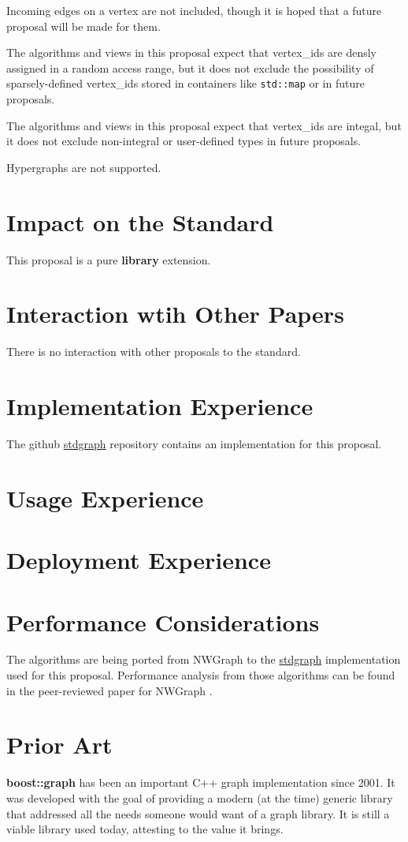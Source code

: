 Incoming edges on a vertex are not included, though it is hoped that a future proposal will be made for them.

The algorithms and views in this proposal expect that vertex\_ids are densly assigned in a random access range, but it does not exclude the possibility of sparsely-defined vertex\_ids stored in containers like \lstinline{std::map} or  in future proposals. 

The algorithms and views in this proposal expect that vertex\_ids are integal, but it does not exclude non-integral or user-defined types in future proposals.

Hypergraphs are not supported.

\section{Impact on the Standard}
This proposal is a pure \textbf{library} extension.

\section{Interaction wtih Other Papers}
There is no interaction with other proposals to the standard.

\section{Implementation Experience}
The github \href{https://github.com/stdgraph}{stdgraph} repository contains an implementation for this proposal.

\section{Usage Experience}
\section{Deployment Experience}
\section{Performance Considerations}
The algorithms are being ported from NWGraph to the \href{https://github.com/stdgraph}{stdgraph} implementation used for this proposal. Performance analysis from those algorithms can be found in the peer-reviewed paper for NWGraph \cite{REF_nwgraph_paper}.

\section{Prior Art}
\textbf{boost::graph} has been an important C++ graph implementation since 2001. It was developed with the goal of providing
a modern (at the time) generic library that addressed all the needs someone would want of a graph library. It is still a viable library used today, attesting to the value it brings.

